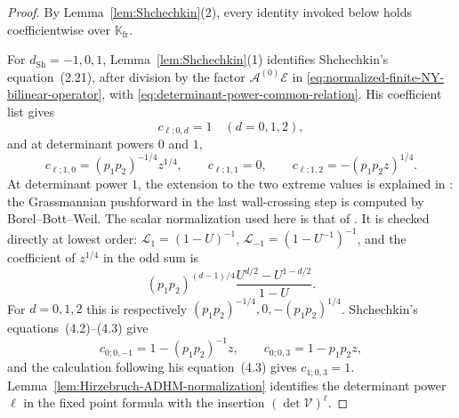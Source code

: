 \documentclass{amsart}
\theoremstyle{definition}
\numberwithin{equation}{section}
\newcommand{\cV}{\mathcal V}
\newcommand{\K}{\mathbb K}
\begin{document}
\begin{proof}
By Lemma~\ref{lem:Shchechkin}(2), every identity invoked below holds coefficientwise over \(\K_{\mathrm{fr}}\).

For \(d_{\mathrm{Sh}}=-1,0,1\), Lemma~\ref{lem:Shchechkin}(1) identifies Shchechkin's equation~(2.21), after division by the factor \(\mathcal A^{(0)}\mathcal E\) in \eqref{eq:normalized-finite-NY-bilinear-operator}, with \eqref{eq:determinant-power-common-relation}.  His coefficient list gives
\[
 c_{\ell;0,d}=1\quad(d=0,1,2),
\]
and at determinant powers \(0\) and \(1\),
\[
 c_{\ell;1,0}=(p_1p_2)^{-1/4}z^{1/4},\qquad
 c_{\ell;1,1}=0,\qquad
 c_{\ell;1,2}=-(p_1p_2z)^{1/4}.
\]
At determinant power \(1\), the extension to the two extreme values is explained in \cite[footnote~6]{BershteinShchechkin}: the Grassmannian pushforward in the last wall-crossing step is computed by Borel--Bott--Weil.  The scalar normalization used here is that of \cite[equation~(2.21)]{Shchechkin}.  It is checked directly at lowest order: \(\mathcal L_1=(1-U)^{-1}\), \(\mathcal L_{-1}=(1-U^{-1})^{-1}\), and the coefficient of \(z^{1/4}\) in the odd sum is
\[
 (p_1p_2)^{(d-1)/4}
 \frac{U^{d/2}-U^{1-d/2}}{1-U}.
\]
For \(d=0,1,2\) this is respectively
\((p_1p_2)^{-1/4},0,-(p_1p_2)^{1/4}\).  Shchechkin's equations~(4.2)--(4.3) give
\[
 c_{0;0,-1}=1-(p_1p_2)^{-1}z,
 \qquad c_{0;0,3}=1-p_1p_2z,
\]
and the calculation following his equation~(4.3) gives \(c_{1;0,3}=1\).  Lemma~\ref{lem:Hirzebruch-ADHM-normalization} identifies the determinant power \(\ell\) in the fixed point formula with the insertion \((\det\cV)^\ell\).


\end{proof}
\end{document}
